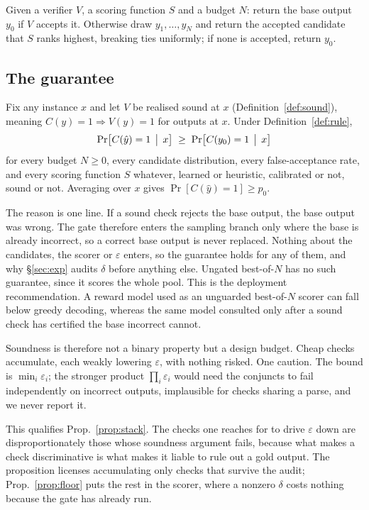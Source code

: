 \documentclass[11pt]{article}
\begin{document}
\begin{definition}\label{def:rule}
Given a verifier $V$, a scoring function $S$ and a budget $N$: return the base
output $y_0$ if $V$ accepts it. Otherwise draw $y_1,\dots,y_N$ and return the
accepted candidate that $S$ ranks highest, breaking ties uniformly; if none is
accepted, return $y_0$.
\end{definition}

\subsection{The guarantee}
\begin{proposition}\label{prop:floor}
Fix any instance $x$ and let $V$ be realised sound at $x$ (Definition~\ref{def:sound}), meaning $C(y)=1\Rightarrow V(y)=1$ for outputs at $x$. Under Definition~\ref{def:rule},
\[
\Pr\bigl[C(\hat y)=1 \,\bigm|\, x\bigr]\;\ge\;\Pr\bigl[C(y_0)=1 \,\bigm|\, x\bigr]
\]
for every budget $N\ge0$, every candidate distribution, every false-acceptance
rate, and every scoring function $S$ whatever, learned or heuristic, calibrated
or not, sound or not. Averaging over $x$ gives $\Pr[C(\hat y)=1]\ge p_0$.
\end{proposition}

The reason is one line. If a sound check rejects the base output, the base output
was wrong. The gate therefore enters the sampling branch only where the base is
already incorrect, so a correct base output is never replaced. Nothing about the
candidates, the scorer or $\varepsilon$ enters, so the
guarantee holds
for any of them, and why \S\ref{sec:exp} audits $\delta$ before anything else.
Ungated best-of-$N$ has no such guarantee, since it scores the whole pool. This
is the deployment recommendation. A reward model used as an unguarded
best-of-$N$ scorer can fall below greedy decoding, whereas the same model
consulted only after a sound check has certified the base incorrect cannot.

Soundness is therefore not a binary property but a design budget. Cheap checks
accumulate, each weakly lowering $\varepsilon$, with nothing risked. One caution.
The bound is $\min_i\varepsilon_i$; the stronger product $\prod_i\varepsilon_i$
would need the conjuncts to fail independently on incorrect outputs, implausible
for checks sharing a parse, and we never report it.

This qualifies Prop.~\ref{prop:stack}. The checks one reaches for to drive
$\varepsilon$ down are disproportionately those whose soundness argument fails,
because what makes a check discriminative is what makes it liable to rule out a
gold output. The proposition licenses accumulating only checks that survive the
audit; Prop.~\ref{prop:floor} puts the rest in the scorer, where a nonzero
$\delta$ costs nothing because the gate has already run.
\end{document}

